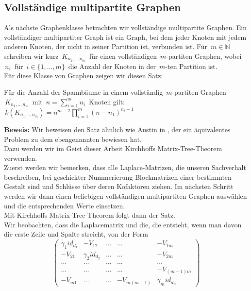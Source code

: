 \subsection{Vollständige multipartite Graphen}
Als nächste Graphenklasse betrachten wir vollständige multipartite Graphen.
Ein vollständiger multipartiter Graph ist ein Graph, bei dem jeder Knoten mit jedem anderen Knoten, der nicht in seiner Partition ist, verbunden ist. Für $\,m\in \mathbb{N}\,$ schreiben wir kurz $\,K_{n_1,..,n_m}\,$ für einen vollständigen $\,m$-partiten Graphen, wobei $\,n_i\,$ für $\,i \in \{1,\ldots,m\}\,$ die Anzahl der Knoten in der $\,m$-ten Partition ist.\\
Für diese Klasse von Graphen zeigen wir diesen Satz:
\begin{Tms}
 Für die Anzahl der Spannbäume in einem vollständig $\,m$-partiten Graphen $\,K_{n_1,..,n_m}\,$ mit $\,n=\sum_{i=1}^mn_i\,$ Knoten gilt:\\
 $\,\mathit{k}(K_{n_1,..,n_m})=n^{m-2}\prod_{i=1}^{m}(n-n_1)^{n_i-1}$
\end{Tms}
\textbf{Beweis:}
Wir beweisen den Satz ähnlich wie Austin in \cite{austin_1960}, der ein äquivalentes Problem zu dem ebengenannten bewiesen hat.\\
Dazu werden wir im Geist dieser Arbeit Kirchhoffs Matrix-Tree-Theorem verwenden.\\
Zuerst werden wir bemerken, dass alle Laplace-Matrizen, die unseren Sachverhalt beschreiben, bei geschickter Nummerierung Blockmatrizen einer bestimmten Gestalt sind und Schlüsse über deren Kofaktoren ziehen. Im nächsten Schritt werden wir dann einen beliebigen vollständigen multipartiten Graphen auswählen und die entsprechenden Werte einsetzen.\\
Mit Kirchhoffs Matrix-Tree-Theorem folgt dann der Satz.\\
Wir beobachten, dass die Laplacematrix und die, die entsteht, wenn man davon die erste Zeile und Spalte streicht, von der Form
\begin{equation*}
\begin{pmatrix}
 {\gamma_1}id_{d_1}&-V_{12}&\ldots&\ldots&-V_{1m}\\
 -V_{21}&{\gamma_2}id_{d_2}&\ldots&\ldots&-V_{2m}\\
 \ldots&\ldots&\ldots&\ldots&\ldots\\
  \ldots&\ldots&\ldots&\ldots&-V_{(m-1)m}\\
 -V_{m1}&\ldots&\ldots&-V_{m(m-1)}&{\gamma_m}id_{d_m}
\end{pmatrix}
\end{equation*}
